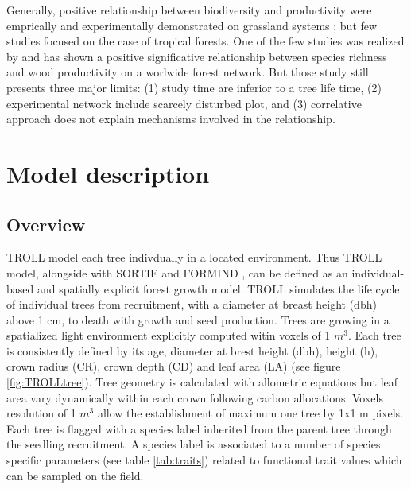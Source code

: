 \documentclass[12pt,]{article}
\let\oldsection\section
\renewcommand\section{\newpage\oldsection}
\theoremstyle{definition}
\theoremstyle{definition}
\theoremstyle{remark}
\begin{document}
Generally, positive relationship between biodiversity and productivity
were emprically and experimentally demonstrated on grassland systems
\citep{Hooper2005a, Loreau2001a, Naeem2002}; but few studies focused on
the case of tropical forests. One of the few studies was realized by
\citet{Chisholm2013} and has shown a positive significative relationship
between species richness and wood productivity on a worlwide forest
network. But those study still presents three major limits: (1) study
time are inferior to a tree life time, (2) experimental network include
scarcely disturbed plot, and (3) correlative approach does not explain
mechanisms involved in the relationship.

\section{Model description}\label{model-description}

\subsection{Overview}\label{overview}

TROLL model each tree indivdually in a located environment. Thus TROLL
model, alongside with SORTIE \citep{Pacala1996, Uriarte2009} and FORMIND
\citep{Fischer2016, Kohler1998}, can be defined as an individual-based
and spatially explicit forest growth model. TROLL simulates the life
cycle of individual trees from recruitment, with a diameter at breast
height (dbh) above 1 cm, to death with growth and seed production. Trees
are growing in a spatialized light environment explicitly computed witin
voxels of 1 \(m^3\). Each tree is consistently defined by its age,
diameter at brest height (dbh), height (h), crown radius (CR), crown
depth (CD) and leaf area (LA) (see figure \ref{fig:TROLLtree}). Tree
geometry is calculated with allometric equations but leaf area vary
dynamically within each crown following carbon allocations. Voxels
resolution of 1 \(m^3\) allow the establishment of maximum one tree by
1x1 m pixels. Each tree is flagged with a species label inherited from
the parent tree through the seedling recruitment. A species label is
associated to a number of species specific parameters (see table
\ref{tab:traits}) related to functional trait values which can be
sampled on the field.
\end{document}
